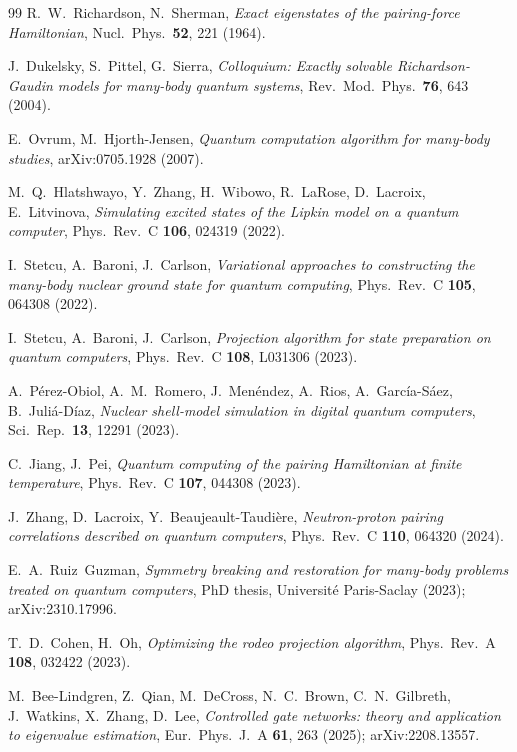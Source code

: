 \documentclass[
  aps,            %
  prc,            %
  reprint,        %
  superscriptaddress,
  floatfix,
  nofootinbib
]{revtex4-2}
\begin{document}
\begin{thebibliography}{99}
R.~W.~Richardson, N.~Sherman,
\textit{Exact eigenstates of the pairing-force Hamiltonian},
Nucl.\ Phys.\ \textbf{52}, 221 (1964).

J.~Dukelsky, S.~Pittel, G.~Sierra,
\textit{Colloquium: Exactly solvable Richardson-Gaudin models for many-body
quantum systems},
Rev.\ Mod.\ Phys.\ \textbf{76}, 643 (2004).

E.~Ovrum, M.~Hjorth-Jensen,
\textit{Quantum computation algorithm for many-body studies},
arXiv:0705.1928 (2007).

M.~Q.~Hlatshwayo, Y.~Zhang, H.~Wibowo, R.~LaRose, D.~Lacroix, E.~Litvinova,
\textit{Simulating excited states of the Lipkin model on a quantum computer},
Phys.\ Rev.\ C \textbf{106}, 024319 (2022).

I.~Stetcu, A.~Baroni, J.~Carlson,
\textit{Variational approaches to constructing the many-body nuclear ground state
for quantum computing},
Phys.\ Rev.\ C \textbf{105}, 064308 (2022).

I.~Stetcu, A.~Baroni, J.~Carlson,
\textit{Projection algorithm for state preparation on quantum computers},
Phys.\ Rev.\ C \textbf{108}, L031306 (2023).

A.~P\'erez-Obiol, A.~M.~Romero, J.~Men\'endez, A.~Rios, A.~Garc\'ia-S\'aez,
B.~Juli\'a-D\'iaz,
\textit{Nuclear shell-model simulation in digital quantum computers},
Sci.\ Rep.\ \textbf{13}, 12291 (2023).

C.~Jiang, J.~Pei,
\textit{Quantum computing of the pairing Hamiltonian at finite temperature},
Phys.\ Rev.\ C \textbf{107}, 044308 (2023).

J.~Zhang, D.~Lacroix, Y.~Beaujeault-Taudi\`ere,
\textit{Neutron-proton pairing correlations described on quantum computers},
Phys.\ Rev.\ C \textbf{110}, 064320 (2024).

E.~A.~Ruiz~Guzman,
\textit{Symmetry breaking and restoration for many-body problems treated on
quantum computers},
PhD thesis, Universit\'e Paris-Saclay (2023); arXiv:2310.17996.

T.~D.~Cohen, H.~Oh,
\textit{Optimizing the rodeo projection algorithm},
Phys.\ Rev.\ A \textbf{108}, 032422 (2023).

M.~Bee-Lindgren, Z.~Qian, M.~DeCross, N.~C.~Brown, C.~N.~Gilbreth, J.~Watkins,
X.~Zhang, D.~Lee,
\textit{Controlled gate networks: theory and application to eigenvalue estimation},
Eur.\ Phys.\ J.\ A \textbf{61}, 263 (2025); arXiv:2208.13557.


\end{thebibliography}
\end{document}
